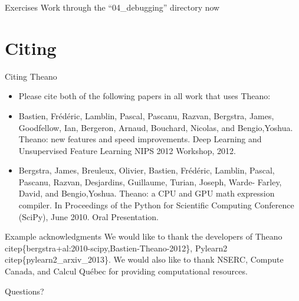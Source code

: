 \documentclass[utf8x,xcolor=pdftex,dvipsnames,table]{beamer}
\begin{document}
\begin{frame}{Exercises}
Work through the ``04\_debugging'' directory now
\end{frame}

\section{Citing}
\begin{frame}{Citing Theano}
  \begin{itemize}
  \item Please cite both of the following papers in
all work that uses Theano:
  \item Bastien, Frédéric, Lamblin, Pascal, Pascanu, Razvan, Bergstra, James, Goodfellow, Ian, Bergeron, Arnaud, Bouchard, Nicolas, and
     Bengio,Yoshua. Theano: new features and speed improvements. Deep Learning and Unsupervised Feature Learning NIPS 2012
    Workshop, 2012.
  \item Bergstra, James, Breuleux, Olivier, Bastien, Frédéric, Lamblin, Pascal, Pascanu, Razvan, Desjardins, Guillaume, Turian, Joseph, Warde-
     Farley, David, and Bengio,Yoshua. Theano: a CPU and GPU math expression compiler. In Proceedings of the Python for Scientific
      Computing Conference (SciPy), June 2010. Oral Presentation.
  \end{itemize}
\end{frame}

\begin{frame}{Example acknowledgments}
We would like to thank the developers of
Theano \\citep\{bergstra+al:2010-scipy,Bastien-Theano-2012\},
Pylearn2 \\citep\{pylearn2\_arxiv\_2013\}. We would also like
to thank NSERC, Compute Canada, and Calcul Qu\'ebec
for providing computational resources.
\end{frame}


\begin{frame}
\begin{center}

\Huge
Questions?
\end{center}
\end{frame}
\end{document}
